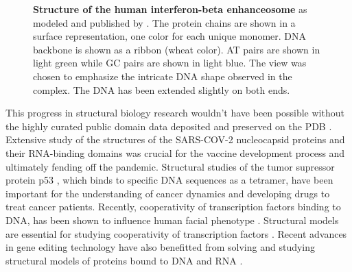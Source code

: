 \begin{center}
    \begin{figure}[H]
        \caption[Structure of the human interferon-beta enhanceosome]{\textbf{ Structure of the human interferon-beta enhanceosome} as modeled and published by \citet{panne2007atomic}. The protein chains are shown in a surface representation, one color for each unique monomer. DNA backbone is shown as a ribbon (wheat color). AT pairs are shown in light green while GC pairs are shown in light blue. The view was chosen to emphasize the intricate DNA shape observed in the complex. The DNA has been extended slightly on both ends.}
  \label{fig:mmc2}
\end{figure}
\end{center}
This progress in structural biology research wouldn't have been possible without the highly curated public domain data deposited and preserved on the PDB \citep{berman2000protein, wwpdb2019protein}. Extensive study of the structures of the SARS-COV-2 nucleocapsid proteins and their RNA-binding domains \citep{jackson2022mechanisms, cubuk2021sars} was crucial for the vaccine development process and ultimately fending off the pandemic. Structural studies of the tumor supressor protein p53 \citep{Vousden2009, Kitayner2006, Barakat2011, Kitayner2010}, which binds to specific DNA sequences as a tetramer, have been important for the understanding of cancer dynamics and developing drugs to treat cancer patients. Recently, cooperativity of transcription factors binding to DNA, has been shown to influence human facial phenotype \citep{kim2024dna}. Structural models are essential for studying cooperativity of transcription factors \citep{michael2020mechanisms}. Recent advances in gene editing technology have also benefitted from solving and studying structural models of proteins bound to DNA and RNA \citep{durrant2024bridge}. 

